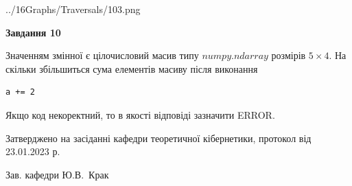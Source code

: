 \documentclass[12pt, ukrainian]{article}
\begin{document}
{\begin {large}
\begin{center}
	{../16Graphs/Traversals/103.png}
\end{center}\par
\newpage

{\begin {center}\textbf{Завдання 10}\end {center}}\par
Значенням змінної  є цілочисловий масив типу $numpy.ndarray$ розмірів $5{\times}4$. На скільки збільшиться сума елементів масиву  після виконання
\begin{verbatim}
a += 2
\end{verbatim}


Якщо код некоректний, то в якості відповіді зазначити ERROR.\par
\newpage


\end {large}
}
{\smallskip \begin {small} Затверджено на засіданні кафедри теоретичної кібернетики, протокол  від   23.01.2023 р.\par\smallskip\smallskip
{\parbox {6.5 cm}{Зав. кафедри \dotfill Ю.В.~Крак}} \end{small}}
\end{document}

